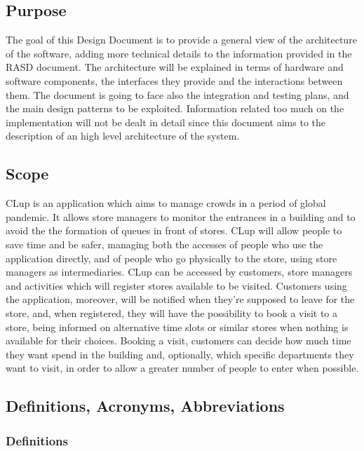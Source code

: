 \renewcommand{\thesubsection}{\Alph{subsection}}
     	\subsection{Purpose}
	The goal of this Design Document is to provide a general view of the architecture of the software, adding more technical details to the information provided in the RASD document. The architecture will be explained in terms of hardware and software components, the interfaces they provide and the interactions between them. The document is going to face also the integration and testing plans, and the main design patterns to be exploited. Information related too much on the implementation will not be dealt in detail since this document aims to the description of an high level architecture of the system. 
         \subsection{Scope}
         CLup is an application which aims to manage crowds in a period of global pandemic. It allows store managers to monitor the entrances in a building and to avoid the the formation of queues in front of stores. CLup will allow people to save time and be safer, managing both the accesses of people who use the application directly, and of people who go physically to the store, using store managers as intermediaries. CLup can be accessed by customers, store managers and activities which will register stores available to be visited. Customers using the application, moreover, will be notified when they're supposed to leave for the store, and, when registered, they will have the possibility to book a visit to a store, being informed on alternative time slots or similar stores when nothing is available for their choices.  Booking a visit, customers can decide how much time they want spend in the building and, optionally, which specific departments they want to visit, in order to allow a greater number of people to enter when possible.
         
         \subsection{Definitions, Acronyms, Abbreviations}
         	\subsubsection{Definitions}
		
